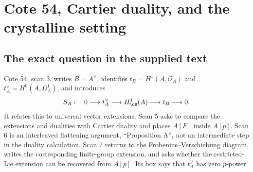 \documentclass[11pt,a4paper]{article}
\theoremstyle{definition}\newtheorem{remark}[theorem]{Remark}
\begin{document}
\section{Cote 54, Cartier duality, and the crystalline setting}

\subsection{The exact question in the supplied text}

Cote 54, scan 3, writes $B=A^\vee$, identifies $t_B=H^1(A,\mathcal O_A)$ and $t_A^\vee=H^0(A,\Omega_A^1)$, and introduces
\begin{equation}\label{eq:SA}
 S_A:\quad 0\longrightarrow t_A^\vee\longrightarrow H^1_\dR(A)
 \longrightarrow t_B\longrightarrow0.
\end{equation}
It relates this to universal vector extensions. Scan 5 asks to compare the extensions and dualities with Cartier duality and places $A[F]$ inside $A[p]$. Scan 6 is an interleaved flattening argument, ``Proposition A'', not an intermediate step in the duality calculation. Scan 7 returns to the Frobenius--Verschiebung diagram, writes the corresponding finite-group extension, and asks whether the restricted-Lie extension can be recovered from $A[p]$. Its box says that $t_A^\vee$ has zero $p$-power.
\end{document}
